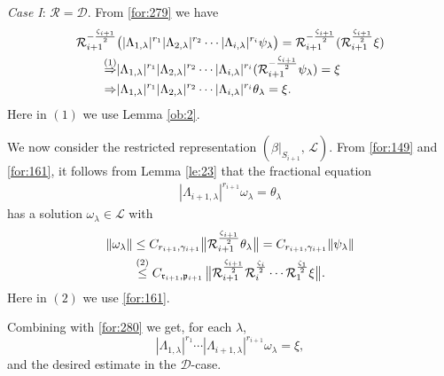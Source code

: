 \documentclass[11 pt]{amsart}
\theoremstyle{definition}
\numberwithin{equation}{section}
\begin{document}
\emph{Case I}:  $\mathcal{R}=\mathcal{D}$.  From \eqref{for:279} we have
\begin{align}\label{for:280}
  \mathcal{R}_{i+1}^{-\frac{\zeta_{i+1}}{2}}&\big( |\Lambda_{1,\lambda}|^{r_1}|\Lambda_{2,\lambda}|^{r_2}\cdots |\Lambda_{i,\lambda}|^{r_i}\psi_\lambda \big)=\mathcal{R}_{i+1}^{-\frac{\zeta_{i+1}}{2}}(\mathcal{R}_{i+1}^{\frac{\zeta_{i+1}}{2}}\xi)\notag\\
  \overset{\text{(1)}}{\Rightarrow} & |\Lambda_{1,\lambda}|^{r_1}|\Lambda_{2,\lambda}|^{r_2}\cdots |\Lambda_{i,\lambda}|^{r_i}(\mathcal{R}_{i+1}^{-\frac{\zeta_{i+1}}{2}}\psi_\lambda)=\xi\notag\\
  \Rightarrow & |\Lambda_{1,\lambda}|^{r_1}|\Lambda_{2,\lambda}|^{r_2}\cdots |\Lambda_{i,\lambda}|^{r_i}\theta_\lambda=\xi.
\end{align}
Here in $(1)$ we use Lemma \ref{ob:2}.

We now consider the restricted representation $(\beta|_{S_{i+1}},\,\mathcal{L})$. From \eqref{for:149} and \eqref{for:161}, it follows from Lemma \ref{le:23} that
the fractional equation
\begin{align*}
  |\Lambda_{i+1,\lambda}|^{r_{i+1}}\omega_{\lambda}=\theta_\lambda
\end{align*}
has a solution $\omega_{\lambda}\in \mathcal{L}$ with
\begin{align}\label{for:281}
 \|\omega_{\lambda}\|
   &\leq C_{r_{i+1},\gamma_{i+1}}
     \big\|\mathcal{R}_{i+1}^{\frac{\zeta_{i+1}}{2}}\theta_\lambda\big\|
     = C_{r_{i+1},\gamma_{i+1}}\|\psi_\lambda\|\notag\\
     &\overset{\text{(2)}}{\leq}
     C_{\mathfrak{r}_{i+1},\mathfrak{p}_{i+1}}\,
     \big\|\mathcal{R}_{i+1}^{\frac{\zeta_{i+1}}{2}}\mathcal{R}_i^{\frac{\zeta_i}{2}}\cdots\mathcal{R}_1^{\frac{\zeta_1}{2}}\xi\big\|.
\end{align}
Here in $(2)$ we use \eqref{for:161}.

Combining with \eqref{for:280} we get, for each $\lambda$,
\[
  |\Lambda_{1,\lambda}|^{r_1}\cdots|\Lambda_{i+1,\lambda}|^{r_{i+1}}\omega_\lambda
   = \xi,
\]
and the desired estimate in the $\mathcal D$-case.
\end{document}
